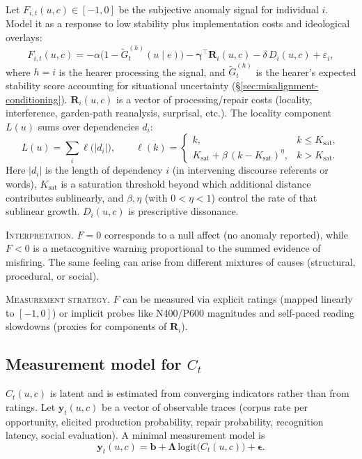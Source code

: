 \documentclass[12pt,letterpaper]{article}
\begin{document}
Let $F_{i,t}(u,c)\in[-1,0]$ be the subjective anomaly signal for individual $i$.
Model it as a response to low stability plus implementation costs and ideological overlays:
\begin{equation*}
F_{i,t}(u,c)=
-\alpha\bigl(1-\widetilde{G}^{(h)}_t(u\mid e)\bigr)
-\mathbf{\gamma}^{\top}\mathbf{R}_{i}(u,c)
-\delta\,D_i(u,c)
+\varepsilon_i,
\end{equation*}
where $h=i$ is the hearer processing the signal, and $\widetilde{G}^{(h)}_t$ is the hearer's expected stability score accounting for situational uncertainty (\S\ref{sec:misalignment-conditioning}).
$\mathbf{R}_{i}(u,c)$ is a vector of processing/repair costs (locality, interference,
garden-path reanalysis, surprisal, etc.). The locality component $L(u)$ sums over dependencies $d_i$:
\begin{equation*}
L(u)=\sum_{i}\ell\!\bigl(|d_i|\bigr),\qquad
\ell(k)=
  \begin{cases}
    k, & k\le K_{\text{sat}},\\[4pt]
    K_{\text{sat}}+\beta\,(k-K_{\text{sat}})^{\eta}, & k>K_{\text{sat}}.
  \end{cases}
\end{equation*}
Here $|d_i|$ is the length of dependency $i$ (in intervening discourse referents or words), $K_{\text{sat}}$ is a saturation threshold beyond which additional distance contributes sublinearly, and $\beta,\eta$ (with $0<\eta<1$) control the rate of that sublinear growth. $D_i(u,c)$ is prescriptive dissonance.

\textsc{Interpretation.} $F=0$ corresponds to a null affect (no anomaly reported), while $F<0$ is a metacognitive warning proportional to the summed evidence of misfiring. The same feeling can arise from different mixtures of causes (structural, procedural, or social).

\textsc{Measurement strategy.} $F$ can be measured via explicit ratings (mapped linearly to $[-1,0]$) or implicit probes like N400/P600 magnitudes and self-paced reading slowdowns (proxies for components of $\mathbf{R}_i$).

\subsection{Measurement model for $C_t$}
\label{sec:measurement-C}

$C_t(u,c)$ is latent and is estimated from converging indicators rather than from ratings.
Let $\mathbf{y}_t(u,c)$ be a vector of observable traces (corpus rate per opportunity,
elicited production probability, repair probability, recognition latency, social evaluation).
A minimal measurement model is
\begin{equation*}
\mathbf{y}_t(u,c)=\mathbf{b}+\mathbf{\Lambda}\,\mathrm{logit}\!\bigl(C_t(u,c)\bigr)+\boldsymbol{\epsilon}.
\end{equation*}
\end{document}
